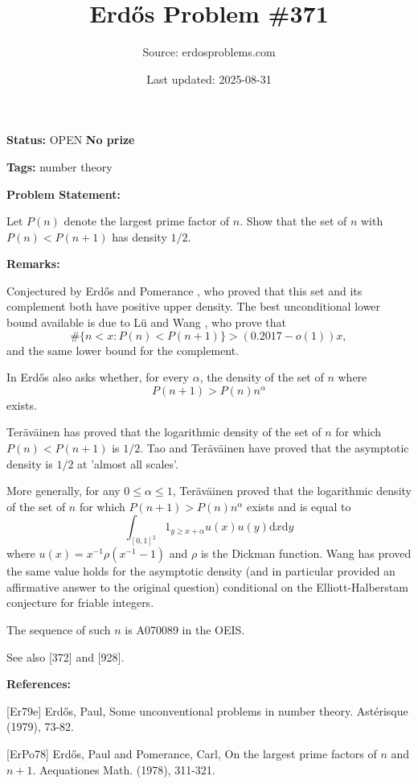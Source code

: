 \documentclass{article}
\title{Erd\H{o}s Problem \#371}
\date{Last updated: 2025-08-31}
\author{Source: erdosproblems.com}
\begin{document}
\maketitle

\noindent\textbf{Status:} OPEN \quad \textbf{No prize}

\noindent\textbf{Tags:} number theory

\medskip
\noindent\textbf{Problem Statement:}

Let $P(n)$ denote the largest prime factor of $n$. Show that the set of $n$ with $P(n)<P(n+1)$ has density $1/2$.

\bigskip
\noindent\textbf{Remarks:}

Conjectured by Erd\H{o}s and Pomerance \cite{ErPo78}, who proved that this set and its complement both have positive upper density. The best unconditional lower bound available is due to L\"{u} and Wang \cite{LuWa25}, who prove that\[\#\{ n<x :P(n)<P(n+1)\} > (0.2017-o(1))x,\]and the same lower bound for the complement.

In \cite{Er79e} Erd\H{o}s also asks whether, for every $\alpha$, the density of the set of $n$ where\[P(n+1)>P(n)n^\alpha\]exists.

Ter\"{a}v\"{a}inen \cite{Te18} has proved that the logarithmic density of the set of $n$ for which $P(n)<P(n+1)$ is $1/2$. Tao and Ter\"{a}v\"{a}inen \cite{TaTe19} have proved that the asymptotic density is $1/2$ at 'almost all scales'.

More generally, for any $0\leq \alpha \leq1$, Ter\"{a}v\"{a}inen \cite{Te18} proved that the logarithmic density of the set of $n$ for which $P(n+1)>P(n)n^\alpha$ exists and is equal to\[\int_{[0,1]^2}1_{y\geq x+\alpha}u(x)u(y)\mathrm{d}x\mathrm{d}y\]where $u(x)=x^{-1}\rho(x^{-1}-1)$ and $\rho$ is the Dickman function. Wang \cite{Wa21} has proved the same value holds for the asymptotic density (and in particular provided an affirmative answer to the original question) conditional on the Elliott-Halberstam conjecture for friable integers.

The sequence of such $n$ is A070089 in the OEIS.

See also [372] and [928].

\bigskip
\noindent\textbf{References:}

[Er79e] Erd\H{o}s, Paul, Some unconventional problems in number theory. Ast\'{e}risque (1979), 73-82.
 
 [ErPo78] Erd\H{o}s, Paul and Pomerance, Carl, On the largest prime factors of {$n$} and {$n+1$}. Aequationes Math. (1978), 311-321.
 
\end{document}
